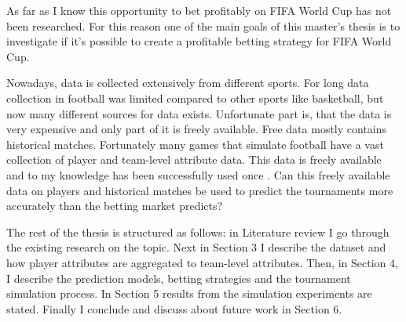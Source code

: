 As far as I know this opportunity to bet profitably on FIFA World Cup has not been researched. For this reason one of the main goals of this master's thesis is to investigate if it's possible to create a profitable betting strategy for FIFA World Cup.

Nowadays, data is collected extensively from different sports. For long data collection in football was limited compared to other sports like basketball, but now many different sources for data exists. Unfortunate part is, that the data is very expensive and only part of it is freely available. Free data mostly contains historical matches. Fortunately many games that simulate football have a vast collection of player and team-level attribute data. This data is freely available and to my knowledge has been successfully used once \cite{shin2014novel}. Can this freely available data on players and historical matches be used to predict the tournaments more accurately than the betting market predicts?

The rest of the thesis is structured as follows: in Literature review I go through the existing research on the topic. Next in Section 3 I describe the dataset and how player attributes are aggregated to team-level attributes. Then, in Section 4, I describe the prediction models, betting strategies and the tournament simulation process. In Section 5 results from the simulation experiments are stated. Finally I conclude and discuss about future work in Section 6.
